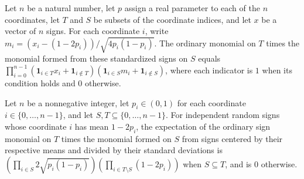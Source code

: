 \begin{theorem}
\label{FABL.monomial_mul_heterogeneousBiasedMonomial}
\leanok
{}
Let $n$ be a natural number, let $p$ assign a real parameter to each of the $n$
coordinates, let $T$ and $S$ be subsets of the coordinate indices, and let $x$ be a
vector of $n$ signs. For each coordinate $i$, write
$m_i=(x_i-(1-2p_i))/\sqrt{4p_i(1-p_i)}$. The ordinary monomial on $T$ times the monomial
formed from these standardized signs on $S$ equals $\prod_{i=0}^{n-1} (\mathbf{1}_{i\in
T}x_i+\mathbf{1}_{i\notin T})(\mathbf{1}_{i\in S}m_i+\mathbf{1}_{i\notin S})$, where
each indicator is $1$ when its condition holds and $0$ otherwise.
\end{theorem}

\begin{theorem}
\label{FABL.pmfExpectation_monomial_mul_heterogeneousBiasedMonomial}
\leanok
{}
Let $n$ be a nonnegative integer, let $p_i\in(0,1)$ for each coordinate
$i\in\{0,\ldots,n-1\}$, and let $S,T\subseteq\{0,\ldots,n-1\}$. For independent random
signs whose coordinate $i$ has mean $1-2p_i$, the expectation of the ordinary sign
monomial on $T$ times the monomial formed on $S$ from signs centered by their respective
means and divided by their standard deviations is $\left(\prod_{i\in
S}2\sqrt{p_i(1-p_i)}\right)\left(\prod_{i\in T\setminus S}(1-2p_i)\right)$ when
$S\subseteq T$, and is $0$ otherwise.
\end{theorem}

